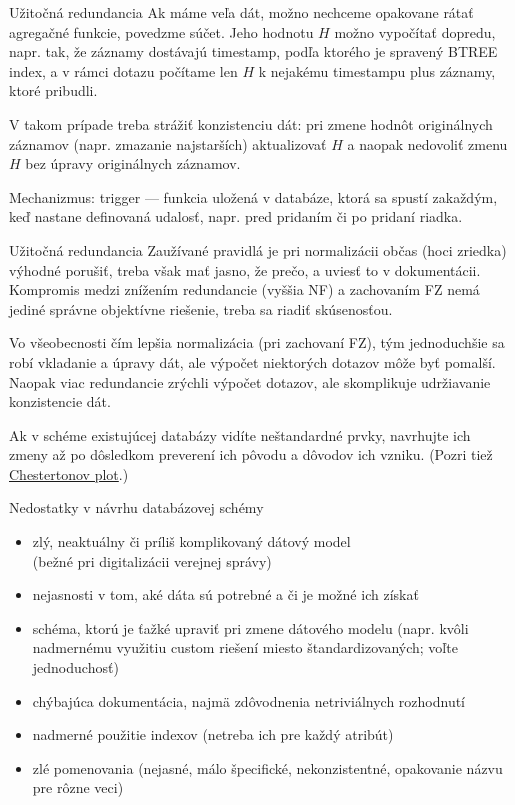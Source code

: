 \documentclass[12pt]{beamer}
\begin{document}
\begin{frame}{Užitočná redundancia}
Ak máme veľa dát, možno nechceme opakovane rátať agregačné funkcie, povedzme súčet.
Jeho hodnotu $H$ možno vypočítať dopredu, napr. tak, že záznamy dostávajú timestamp,
podľa ktorého je spravený BTREE index, a v rámci dotazu počítame
len $H$ k nejakému timestampu plus záznamy, ktoré pribudli.

\bigskip
V takom prípade treba strážiť konzistenciu dát: pri zmene hodnôt originálnych záznamov
(napr. zmazanie najstarších) aktualizovať $H$ a naopak nedovoliť zmenu $H$ bez úpravy originálnych záznamov.

\bigskip
Mechanizmus: \alert{trigger} --- funkcia uložená v databáze, ktorá sa spustí zakaždým,
keď nastane definovaná udalosť, napr. pred pridaním či po pridaní riadka.
\end{frame}

\begin{frame}{Užitočná redundancia}
Zaužívané pravidlá je pri normalizácii občas (hoci zriedka) výhodné porušiť,
treba však mať jasno, že prečo, a uviesť to v dokumentácii.
Kompromis medzi znížením redundancie (vyššia NF) a zachovaním FZ nemá
jediné správne objektívne riešenie, treba sa riadiť skúsenosťou.
\bigskip

Vo všeobecnosti čím lepšia normalizácia (pri zachovaní FZ),
tým jednoduchšie sa robí vkladanie a úpravy dát, ale výpočet niektorých dotazov môže byť pomalší.
Naopak viac redundancie zrýchli výpočet dotazov, ale skomplikuje udržiavanie konzistencie dát.

Ak v schéme existujúcej databázy vidíte neštandardné prvky,
navrhujte ich zmeny až po dôsledkom preverení ich pôvodu a dôvodov ich vzniku.
(Pozri tiež \href{https://fs.blog/chestertons-fence/}{Chestertonov plot}.)
\end{frame}

\begin{frame}[fragile]{Nedostatky v návrhu databázovej schémy}
\begin{itemize}
\item zlý, neaktuálny či príliš komplikovaný dátový model\\ (bežné pri digitalizácii verejnej správy)
\item nejasnosti v tom, aké dáta sú potrebné a či je možné ich získať
\item schéma, ktorú je ťažké upraviť pri zmene dátového modelu
      (napr. kvôli nadmernému využitiu custom riešení miesto štandardizovaných; voľte jednoduchosť)
\item chýbajúca dokumentácia, najmä zdôvodnenia netriviálnych rozhodnutí
\item nadmerné použitie indexov (netreba ich  pre každý atribút)
\item zlé pomenovania (nejasné, málo špecifické, nekonzistentné, opakovanie názvu pre rôzne veci)
\end{itemize}
\end{frame}
\end{document}

